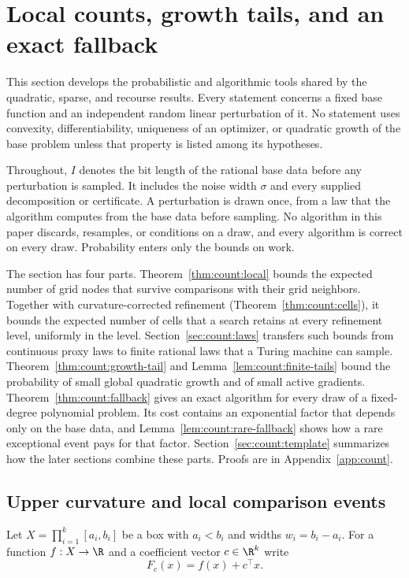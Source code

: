\section{Local counts, growth tails, and an exact fallback}\label{sec:count}

This section develops the probabilistic and algorithmic tools shared by the
quadratic, sparse, and recourse results. Every statement concerns a fixed
base function and an independent random linear perturbation of it. No
statement uses convexity, differentiability, uniqueness of an optimizer, or
quadratic growth of the base problem unless that property is listed among
its hypotheses.

Throughout, $I$ denotes the bit length of the rational base data before any
perturbation is sampled. It includes the noise width $\sigma$ and every
supplied decomposition or certificate. A perturbation is drawn once, from a
law that the algorithm computes from the base data before sampling. No
algorithm in this paper discards, resamples, or conditions on a draw, and
every algorithm is correct on every draw. Probability enters only the bounds
on work.

The section has four parts. Theorem~\ref{thm:count:local} bounds the
expected number of grid nodes that survive comparisons with their grid
neighbors. Together with curvature-corrected refinement
(Theorem~\ref{thm:count:cells}), it bounds the expected number of cells that
a search retains at every refinement level, uniformly in the level.
Section~\ref{sec:count:laws} transfers such bounds from continuous proxy
laws to finite rational laws that a Turing machine can sample.
Theorem~\ref{thm:count:growth-tail} and Lemma~\ref{lem:count:finite-tails}
bound the probability of small global quadratic growth and of small active
gradients. Theorem~\ref{thm:count:fallback} gives an exact algorithm for
every draw of a fixed-degree polynomial problem. Its cost contains an
exponential factor that depends only on the base data, and
Lemma~\ref{lem:count:rare-fallback} shows how a rare exceptional event pays
for that factor. Section~\ref{sec:count:template} summarizes how the later
sections combine these parts. Proofs are in Appendix~\ref{app:count}.

\subsection{Upper curvature and local comparison events}\label{sec:count:local}

Let $X=\prod_{i=1}^k[a_i,b_i]$ be a box with $a_i<b_i$ and widths
$w_i=b_i-a_i$. For a function $f:X\to\R$ and a coefficient vector
$c\in\R^k$ write
\[
 F_c(x)=f(x)+c^\top x .
\]

